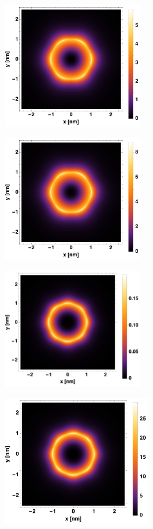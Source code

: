 \documentclass[a4paper,10pt]{article}
\begin{document}
\begin{figure}[htb!]
\begin{subfigure}[c]{0.5\textwidth}
\caption{}
\end{subfigure}
\begin{subfigure}[c]{0.5\textwidth}
\includegraphics[width=170pt]{ME3.pdf}
\caption{}
\end{subfigure}
\begin{subfigure}[c]{0.5\textwidth}
\includegraphics[width=170pt]{ME3(Mar).pdf}
\caption{}
\end{subfigure}
\begin{subfigure}[c]{0.5\textwidth}
\includegraphics[width=170pt]{ME4.pdf}
\caption{}
\end{subfigure}
\begin{subfigure}[c]{0.5\textwidth}
\includegraphics[width=180pt]{ME4(Mar).pdf}

\end{subfigure}
\end{figure}
\end{document}
